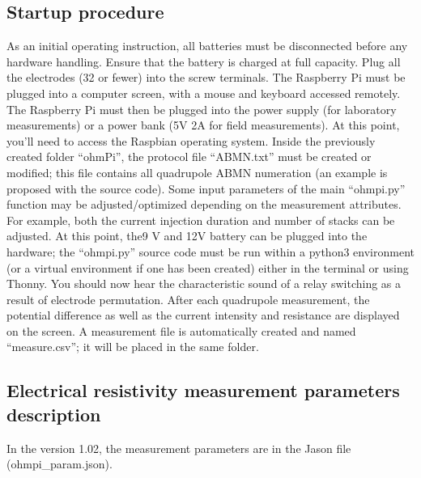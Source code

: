 \documentclass[letterpaper,10pt,english]{sphinxmanual}
\begin{document}
\subsection{Startup procedure}
\label{\detokenize{V2_00:startup-procedure}}
\sphinxAtStartPar
As an initial operating instruction, all batteries must be disconnected before any hardware handling. Ensure that the battery is charged at full capacity. Plug all the electrodes (32 or fewer)
into the screw terminals. The Raspberry Pi must be plugged into a computer screen, with a mouse and keyboard accessed remotely. The Raspberry Pi must then be plugged into the power supply
(for laboratory measurements) or a power bank (5V \sphinxhyphen{} 2A for field measurements). At this point, you’ll need to access the Raspbian operating system. Inside the previously created folder “ohmPi”,
the protocol file “ABMN.txt” must be created or modified; this file contains all quadrupole ABMN numeration (an example is proposed with the source code). Some input parameters of the main “ohmpi.py”
function may be adjusted/optimized depending on the measurement attributes. For example, both the current injection duration and number of stacks can be adjusted. At this point, the9 V and 12\sphinxhyphen{}V battery can be
plugged into the hardware; the “ohmpi.py” source code must be run within a python3 environment (or a virtual environment if one has been created) either in the terminal or using Thonny. You should now
hear the characteristic sound of a relay switching as a result of electrode permutation. After each quadrupole measurement, the potential difference as well as the current intensity and resistance
are displayed on the screen. A measurement file is automatically created and named “measure.csv”; it will be placed in the same folder.


\subsection{Electrical resistivity measurement parameters description}
\label{\detokenize{V2_00:electrical-resistivity-measurement-parameters-description}}
\sphinxAtStartPar
In the version 1.02, the measurement parameters are in the Jason file (ohmpi\_param.json).

\begin{sphinxVerbatim}[commandchars=\\\{\},numbers=left,firstnumber=1,stepnumber=1]
    
    
   
   
   
  
\end{sphinxVerbatim}
\end{document}

